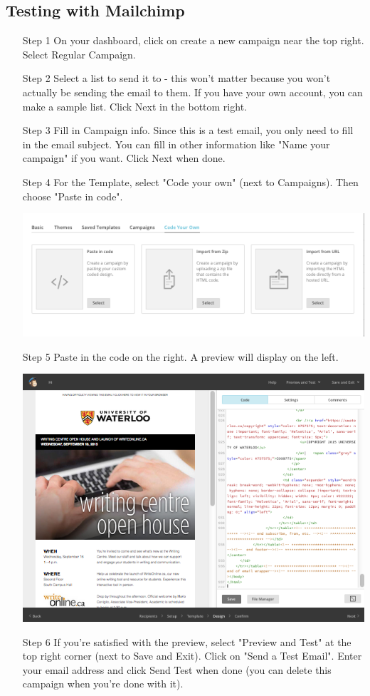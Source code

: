 \documentclass[a4paper,11pt]{article}
\begin{document}
	\newpage
	
	\subsection{Testing with Mailchimp}
	\begin{itemize}
		\item[Step 1] On your dashboard, click on create a new campaign near the top right. Select Regular Campaign.
		\item[Step 2] Select a list to send it to - this won't matter because you won't actually be sending the email to them. If you have your own account, you can make a sample list. Click Next in the bottom right.
		\item[Step 3] Fill in Campaign info. Since this is a test email, you only need to fill in the email subject. You can fill in other information like "Name your campaign" if you want. Click Next when done.
		\item[Step 4] For the Template, select "Code your own" (next to Campaigns). Then choose "Paste in code".
		\begin{center}
		\includegraphics[scale=0.58]{images/step1}
		\end{center}
		\item[Step 5] Paste in the code on the right. A preview will display on the left. 
		\begin{center}
		\includegraphics[scale=0.48]{images/step2}
		\end{center}
		\item[Step 6] If you're satisfied with the preview, select "Preview and Test" at the top right corner (next to Save and Exit). Click on "Send a Test Email". Enter your email address and click Send Test when done (you can delete this campaign when you're done with it).
	\end{itemize}
\end{document}
